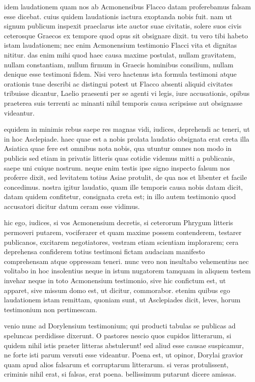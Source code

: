  idem laudationem quam nos ab Acmonensibus Flacco datam proferebamus falsam esse dicebat. cuius quidem laudationis iactura exoptanda nobis fuit. nam ut signum publicum inspexit praeclarus iste auctor suae civitatis, solere suos civis ceterosque Graecos ex tempore quod opus sit obsignare dixit. tu vero tibi habeto istam laudationem; nec enim Acmonensium testimonio Flacci vita et dignitas nititur. das enim mihi quod haec causa maxime postulat, nullam gravitatem, nullam constantiam, nullum firmum in Graecis hominibus consilium, nullam denique esse testimoni fidem. Nisi vero hactenus ista formula testimoni atque orationis tuae describi ac distingui potest ut Flacco absenti aliquid civitates tribuisse dicantur, Laelio praesenti per se agenti vi legis, iure accusationis, opibus praeterea suis terrenti ac minanti nihil temporis causa scripsisse aut obsignasse videantur.

 equidem in minimis rebus saepe res magnas vidi, iudices, deprehendi ac teneri, ut in hoc Asclepiade. haec quae est a nobis prolata laudatio obsignata erat creta illa Asiatica quae fere est omnibus nota nobis, qua utuntur omnes non modo in publicis sed etiam in privatis litteris quas cotidie videmus mitti a publicanis, saepe uni cuique nostrum. neque enim testis ipse signo inspecto falsum nos proferre dixit, sed levitatem totius Asiae protulit, de qua nos et libenter et facile concedimus. nostra igitur laudatio, quam ille temporis causa nobis datam dicit, datam quidem confitetur, consignata creta est; in illo autem testimonio quod accusatori dicitur datum ceram esse vidimus.

 hic ego, iudices, si vos Acmonensium decretis, si ceterorum Phrygum litteris permoveri putarem, vociferarer et quam maxime possem contenderem, testarer publicanos, excitarem negotiatores, vestram etiam scientiam implorarem; cera deprehensa confiderem totius testimoni fictam audaciam manifesto comprehensam atque oppressam teneri. nunc vero non insultabo vehementius nec volitabo in hoc insolentius neque in istum nugatorem tamquam in aliquem testem invehar neque in toto Acmonensium testimonio, sive hic confictum est, ut apparet, sive missum domo est, ut dicitur, commorabor. etenim quibus ego laudationem istam remittam, quoniam sunt, ut Asclepiades dicit, leves, horum testimonium non pertimescam.

 venio nunc ad Dorylensium testimonium; qui producti tabulas se publicas ad speluncas perdidisse dixerunt. O pastores nescio quos cupidos litterarum, si quidem nihil istis praeter litteras abstulerunt! sed aliud esse causae suspicamur, ne forte isti parum versuti esse videantur. Poena est, ut opinor, Dorylai gravior quam apud alios falsarum et corruptarum litterarum. si veras protulissent, criminis nihil erat, si falsas, erat poena. bellissimum putarunt dicere amissas.

